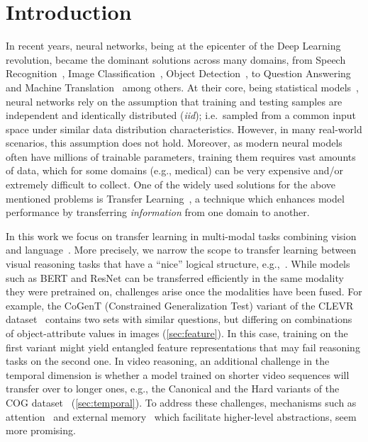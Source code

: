 \section{Introduction}
In recent years, neural networks, being at the epicenter of the Deep Learning~\cite{lecun2015deep} revolution, became the dominant solutions across many domains, from Speech Recognition~\cite{graves2013speech}, Image Classification~\cite{krizhevsky2012imagenet}, Object Detection~\cite{redmon2016you}, to Question Answering~\cite{weston2014memory} and Machine Translation~\cite{bahdanau2014neural} among others.
At their core, being statistical models~\cite{ripley1993statistical,warner1996understanding}, neural networks rely on the assumption that training and testing samples are independent and identically distributed (\textit{iid}); i.e.\ sampled from a common input space under similar data distribution characteristics.
However, in many real-world scenarios, this assumption does not hold. Moreover, as modern neural models often have millions of trainable parameters, training them requires vast amounts of data, which for some domains (e.g., medical) can be very expensive and/or extremely difficult to collect.
One of the widely used solutions for the above mentioned problems is Transfer Learning~\cite{pan2009survey,weiss2016survey}, a technique which enhances model performance by transferring \emph{information} from one domain to another.




In this work we focus on transfer learning in multi-modal tasks combining vision and language~\cite{mogadala2019trends}.
More precisely, we narrow the scope to transfer learning between visual reasoning tasks that have a ``nice'' logical structure, e.g.,~\cite{johnson2017clevr,yang2018dataset,song2018explore}. 
While models such as BERT and ResNet can be transferred efficiently in the same modality they were pretrained on, challenges arise
once the modalities have been fused.
For example, the CoGenT (Constrained Generalization Test) variant of the CLEVR dataset~\cite{johnson2017clevr}  
contains two sets with similar questions, but differing on combinations of object-attribute values in images 
(\cref{sec:feature}).
In this case, training on the first variant might yield entangled feature representations that may fail reasoning tasks
on the second one.
In video reasoning, an additional challenge in the temporal dimension is whether a model trained on shorter video sequences will 
transfer over to longer ones, e.g., the Canonical and the Hard variants of the 
COG dataset~\cite{yang2018dataset} (\cref{sec:temporal}).
To address these challenges, mechanisms such as attention~\cite{bahdanau2014neural} 
and external memory~\cite{graves2014neural, graves2016hybrid,weston2014memory} 
which facilitate higher-level abstractions, seem more promising. 

